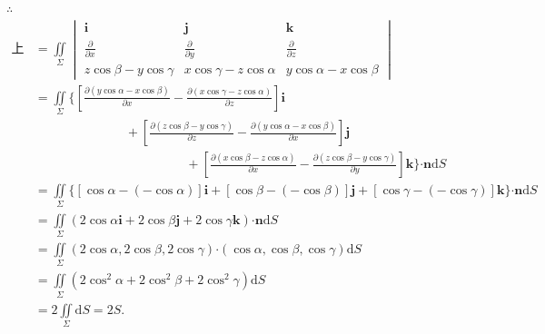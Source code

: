 \documentclass[12pt,UTF8]{ctexart}
\newcommand{\md}[1]{\mathrm d#1}
\newcommand{\BSIInt}[2]{\iint\limits_{#1}#2}
\newcommand{\pp}[2]{\frac{\partial #1}{\partial #2}}
\begin{document}
\begin{enumerate}
$\therefore$
\[\begin{aligned}
\text{上式}&=\BSIInt\Sigma{\begin{vmatrix}
\bm i&\bm j&\bm k\\
\frac\partial{\partial x}&\frac\partial{\partial y}&\frac\partial{\partial z}\\
z\cos\beta-y\cos\gamma&x\cos\gamma-z\cos\alpha&y\cos\alpha-x\cos\beta
\end{vmatrix}}\\
&=\BSIInt\Sigma{\{[\pp{(y\cos\alpha-x\cos\beta)}x-\pp{(x\cos\gamma-z\cos\alpha)}z]\bm i\\
&\hspace{3cm}+[\pp{(z\cos\beta-y\cos\gamma)}z-\pp{(y\cos\alpha-x\cos\beta)}x]\bm j\\
&\hspace{5cm}+[\pp{(x\cos\beta-z\cos\alpha)}x-\pp{(z\cos\beta-y\cos\gamma)}y]\bm k\}\bm\cdot\bm n\md S}\\
&=\BSIInt\Sigma{\{[\cos\alpha-(-\cos\alpha)]\bm i+[\cos\beta-(-\cos\beta)]\bm j+[\cos\gamma-(-\cos\gamma)]\bm k\}\bm\cdot\bm n\md S}\\
&=\BSIInt\Sigma{(2\cos\alpha\bm i+2\cos\beta\bm j+2\cos\gamma\bm k)\bm\cdot\bm n\md S}\\
&=\BSIInt\Sigma{(2\cos\alpha,2\cos\beta,2\cos\gamma)\bm\cdot(\cos\alpha,\cos\beta,\cos\gamma)\md S}\\
&=\BSIInt\Sigma{(2\cos^2\alpha+2\cos^2\beta+2\cos^2\gamma)\md S}\\
&=2\BSIInt\Sigma{\md S}=2S.
\end{aligned}\]
\end{enumerate}
\end{document}
